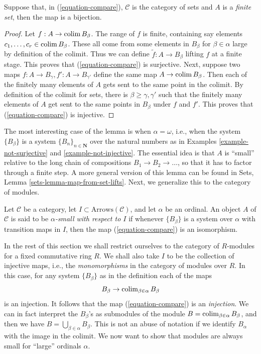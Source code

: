 \begin{lemma}
\label{lemma-out-of-finite}
Suppose that, in (\ref{equation-compare}), $\mathcal{C}$ is the category
of sets and $A$ is a {\it finite set}, then the map is a bijection.
\end{lemma}

\begin{proof}
Let $f : A \to \mathop{\mathrm{colim}}\nolimits B_\beta$.
The range of $f$ is finite, containing say
elements $c_1, \ldots, c_r \in \mathop{\mathrm{colim}}\nolimits B_\beta$.
These all come from some elements in $B_\beta$ for $\beta \in \alpha$
large by definition of the colimit. Thus we can define
$\widetilde{f} : A \to B_\beta$ lifting $f$ at a finite stage.
This proves that (\ref{equation-compare}) is surjective.
Next, suppose two maps $f : A \to B_\gamma, f' : A \to B_{\gamma'}$
define the same map $A \to \mathop{\mathrm{colim}}\nolimits B_\beta$.
Then each of the finitely many elements of $A$ gets sent to the same point in
the colimit. By definition of the colimit for sets, there is
$\beta \geq \gamma, \gamma'$ such that the finitely many elements of
$A$ get sent to the same points in $B_\beta$ under $f$ and $f'$.
This proves that (\ref{equation-compare}) is injective.
\end{proof}

\noindent
The most interesting case of the lemma is when $\alpha = \omega$, i.e.,
when the system $\{B_\beta\}$ is a system $\{B_n\}_{n \in \mathbf{N}}$
over the natural numbers as in
Examples \ref{example-not-surjective} and
\ref{example-not-injective}.
The essential idea is that $A$ is ``small'' relative to the long chain of
compositions $B_1 \to B_2 \to \ldots$, so that it has to factor through a
finite step. A more general version of this lemma can be found in
Sets, Lemma \ref{sets-lemma-map-from-set-lifts}.
Next, we generalize this to the category of modules.

\begin{definition}
\label{definition-small}
Let $\mathcal{C}$ be a category, let $I \subset \text{Arrows}(\mathcal{C})$,
and let $\alpha$ be an ordinal. An object $A$ of $\mathcal{C}$ is said to
be {\it $\alpha$-small with respect to $I$} if whenever $\{B_\beta\}$ is
a system over $\alpha$ with transition maps in $I$, then
the map (\ref{equation-compare}) is an isomorphism.
\end{definition}

\noindent
In the rest of this section we shall restrict ourselves
to the category of $R$-modules for a fixed commutative ring $R$.
We shall also take $I$ to be the collection of injective maps, i.e., the
{\it monomorphisms} in the category of modules over $R$. In this case, for
any system $\{B_\beta\}$ as in the definition each of the maps
$$
B_\beta \to \mathop{\mathrm{colim}}\nolimits_{\beta \in \alpha} B_\beta
$$
is an injection. It follows that the map (\ref{equation-compare}) is an
{\it injection}. We can in fact interpret the $B_\beta$'s as submodules
of the module $B = \mathop{\mathrm{colim}}\nolimits_{\beta \in \alpha} B_\beta$, and then we
have $B = \bigcup_{\beta \in \alpha} B_\beta$. This is not an abuse of
notation if we identify $B_\alpha$ with the image in the colimit.
We now want to show that modules are always small for ``large'' ordinals
$\alpha$.

